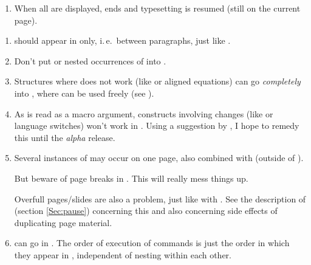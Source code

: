 \begin{slide}
\begin{enumerate}
  \item When all  are displayed,  ends and typesetting is resumed (still on the
    current page).
  \end{enumerate}


  \newslide

  \begin{enumerate}
  \item {} should appear in  only, i.\,e.\ between paragraphs, just like
    .

  \item Don't put  or nested occurrences of  into .

  \item Structures where  does not work (like  or aligned equations) can go
    \emph{completely} into , where  can be used freely (see ).

  \item As  is read as a macro argument, constructs involving  changes (like
     or language switches) won't work in . Using a suggestion by , I hope to remedy this until the \emph{alpha} release.

\newslide

  \item Several instances of  may occur on one page, also combined with  (outside
    of ).

    But beware of page breaks in . This will really mess things up.

    Overfull pages/slides are also a problem, just like with . See the description of 
    (section \ref{Sec:pause}) concerning this and also concerning side effects of duplicating page material.

  \item {} can go in . The order of execution of  commands is just the
    order in which they appear in , independent of nesting within each other.


\end{enumerate}
\end{slide}
